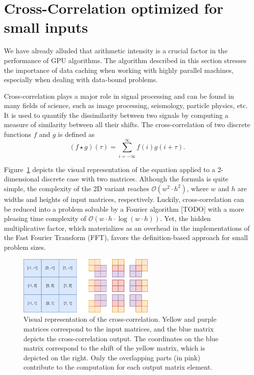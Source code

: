 \section{Cross-Correlation optimized for small inputs}

We have already alluded that arithmetic intensity is a crucial factor in the performance of GPU algorithms. The algorithm described in this section stresses the importance of data caching when working with highly parallel machines, especially when dealing with data-bound problems.

Cross-correlation plays a major role in signal processing and can be found in many fields of science, such as image processing, seismology, particle physics, etc. It is used to quantify the dissimilarity between two signals by computing a measure of similarity between all their shifts. The cross-correlation of two discrete functions $f$ and $g$ is defined as
\begin{equation}
    (f \star g)(\tau) = \sum_{i=-\infty}^{\infty} f(i) g(i+\tau).
\end{equation} 

Figure~\ref{fig:cross-correlation} depicts the visual representation of the equation applied to a 2-dimensional discrete case with two matrices. Although the formula is quite simple, the complexity of the 2D variant reaches $\mathcal{O}(w^2 \cdot h^2)$, where $w$ and $h$ are widths and heights of input matrices, respectively. Luckily, cross-correlation can be reduced into a problem solvable by a Fourier algorithm [TODO] with a more pleasing time complexity of $\mathcal{O}(w\cdot h \cdot \log(w\cdot h))$. Yet, the hidden multiplicative factor, which materializes as an overhead in the implementations of the Fast Fourier Transform (FFT), favors the definition-based approach for small problem sizes.

\begin{figure}
    \centering
    \includegraphics[width=0.6\textwidth]{img/cc.png}
    \caption{Visual representation of the cross-correlation. Yellow and purple matrices correspond to the input matrices, and the blue matrix depicts the cross-correlation output. The coordinates on the blue matrix correspond to the shift of the yellow matrix, which is depicted on the right. Only the overlapping parts (in pink) contribute to the computation for each output matrix element.}
    \label{fig:cross-correlation}
\end{figure}

